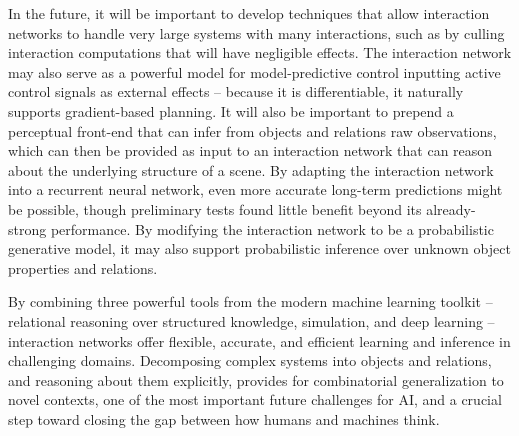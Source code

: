 \documentclass{article}
\begin{document}
In the future, it will be important to develop techniques that allow
interaction networks to handle very large systems with many
interactions, such as by culling interaction computations that will
have negligible effects. The interaction network may also serve as a
powerful model for model-predictive control inputting active control
signals as external effects -- because it is differentiable, it
naturally supports gradient-based planning. It will also be important
to prepend a perceptual front-end that can infer from objects and
relations raw observations, which can then be provided as input to an
interaction network that can reason about the underlying structure of
a scene. By adapting the interaction network into a recurrent neural
network, even more accurate long-term predictions might be possible,
though preliminary tests found little benefit beyond its
already-strong performance. By modifying the interaction network to be
a probabilistic generative model, it may also support probabilistic
inference over unknown object properties and relations.

By combining three powerful tools from the modern machine learning
toolkit -- relational reasoning over structured knowledge, simulation,
and deep learning -- interaction networks offer flexible, accurate,
and efficient learning and inference in challenging
domains. Decomposing complex systems into objects and relations, and
reasoning about them explicitly, provides for combinatorial
generalization to novel contexts, one of the most important future
challenges for AI, and a crucial step toward closing the gap between
how humans and machines think.

\small



\appendix
\newpage

\end{document}
